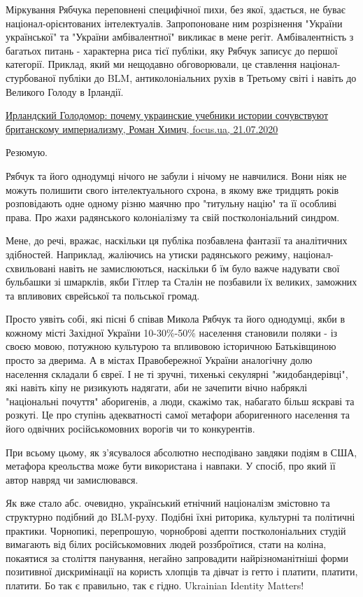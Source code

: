 Міркування Рябчука переповнені специфічної пихи, без якої, здається, не буває
націонал-орієнтованих інтелектуалів. Запропоноване ним розрізнення "України
української" та "України амбівалентної" викликає в мене регіт. Амбівалентність
з багатьох питань - характерна риса тієї публіки, яку Рябчук записує до першої
категорії. Приклад, який ми нещодавно обговорювали, це ставлення
націонал-стурбованої публіки до BLM, антиколоніальних рухів в Третьому світі і
навіть до Великого Голоду в Ірландії.


\href{https://focus.ua/opinion/opinions/459279-irlandskii_golodomor_pochemu_ukrainskie_uchebniki_istorii_sochuvstvuiut_britanskomu_imperializmu}{%
Ирландский Голодомор: почему украинские учебники истории сочувствуют британскому империализму, %
Роман Химич, focus.ua, 21.07.2020%
}

Резюмую.

Рябчук та його однодумці нічого не забули і нічому не навчилися. Вони ніяк не
можуть полишити свого інтелектуального схрона, в якому вже тридцять років
розповідають одне одному різню маячню про "титульну націю" та її особливі
права. Про жахи радянського колоніалізму та свій постколоніальний синдром.

Мене, до речі, вражає, наскільки ця публіка позбавлена фантазії та аналітичних
здібностей. Наприклад, жаліючись на утиски радянського режиму,
націонал-схвильовані навіть не замислюються, наскільки б їм було важче надувати
свої бульбашки зі шмарклів, якби Гітлер та Сталін не позбавили їх великих,
заможних та впливових єврейської та польської громад. 

Просто уявіть собі, які пісні б співав Микола Рябчук та його однодумці, якби в
кожному місті Західної України 10-30\%-50\% населення становили поляки - із своєю
мовою, потужною культурою та впливовою історичною Батьківщиною просто за
дверима. А в містах Правобережної України аналогічну долю населення складали б
євреї. І не ті зручні, тихенькі секулярні "жидобандерівці", які навіть кіпу не
ризикують надягати, аби не зачепити вічно набряклі "національні почуття"
аборигенів, а люди, скажімо так, набагато більш яскраві та розкуті. Це про
ступінь адекватності самої метафори аборигенного населення та його одвічних
російськомовних ворогів чи то конкурентів. 

При всьому цьому, як з'ясувалося абсолютно несподівано завдяки подіям в США,
метафора креольства може бути використана і навпаки. У спосіб, про який її
автор навряд чи замислювався. 

Як вже стало абс. очевидно, український етнічний націоналізм змістовно та
структурно подібний до BLM-руху. Подібні їхні риторика, культурні та політичні
практики. Чорнопикі, перепрошую, чорноброві адепти постколоніальних студій
вимагають від білих російськомовних людей роззброїтися, стати на коліна,
покаятися за століття панування, негайно запровадити найрізноманітніші форми
позитивної дискримінації на користь хлопців та дівчат із гетто і платити,
платити, платити. Бо так є правильно, так є гідно. Ukrainian Identity Matters! 

